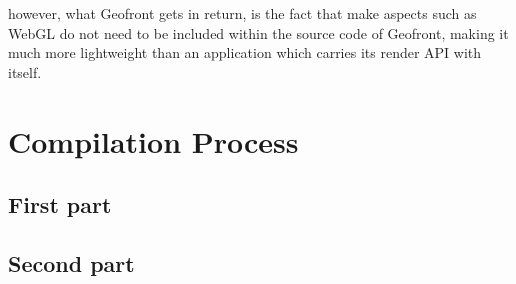 
however, what Geofront gets in return, is the fact that make aspects such as WebGL do not need to be included within the source code of Geofront, making it much more lightweight than an application which carries its render API with itself. 




\section{Compilation Process}
\label{sec:analyses:compilation}

\subsection{First part}

\begin{note}
\end{note}
  
\subsection{Second part}


